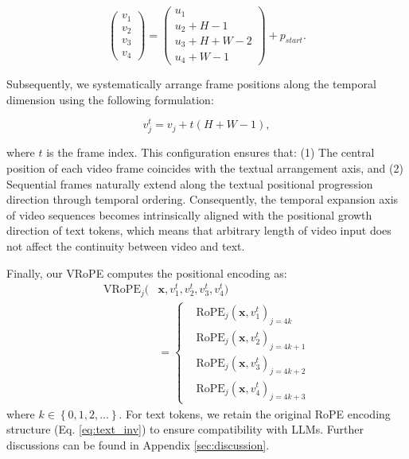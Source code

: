 \documentclass[11pt]{article}
\newcommand{\methodname}{VRoPE\xspace}
\begin{document}
\begin{equation}
\label{eq:center}
\begin{pmatrix}
v_{1} \\
v_{2} \\
v_{3} \\
v_{4}
\end{pmatrix} = 
\begin{pmatrix}
u_{1} \\
u_{2} + H - 1 \\
u_{3} + H + W -2 \\
u_{4} + W - 1
\end{pmatrix} + p_{start}.
\end{equation}

Subsequently, we systematically arrange frame positions along the temporal dimension using the following formulation:

\begin{equation}
\label{eq:offset}
v_{j}^{t} = v_{j} + t(H + W - 1),
\end{equation}

\noindent where $t$ is the frame index. This configuration ensures that: (1) The central position of each video frame coincides with the textual arrangement axis, and (2) Sequential frames naturally extend along the textual positional progression direction through temporal ordering. Consequently, the temporal expansion axis of video sequences becomes intrinsically aligned with the positional growth direction of text tokens, which means that arbitrary length of video input does not affect the continuity between video and text.

Finally, our \methodname computes the positional encoding as:
\begin{equation}
\begin{aligned}
\text{VRoPE}_{j}(& \mathbf{x}, v_{1}^{t}, v_{2}^{t}, v_{3}^{t}, v_{4}^{t}) \\
& = \left\{
\begin{aligned}
& \text{RoPE}_{j}(\mathbf{x}, v_{1}^{t})_{j = 4k} \\
& \text{RoPE}_{j}(\mathbf{x}, v_{2}^{t})_{j = 4k + 1} \\
& \text{RoPE}_{j}(\mathbf{x}, v_{3}^{t})_{j = 4k + 2} \\
& \text{RoPE}_{j}(\mathbf{x}, v_{4}^{t})_{j = 4k + 3}
\end{aligned}
\right.
\end{aligned}
\end{equation}
\noindent where $k \in \left\{0, 1, 2, ...\right\}$. For text tokens, we retain the original RoPE encoding structure (Eq. \ref{eq:text_inv}) to ensure compatibility with LLMs. Further discussions can be found in Appendix \ref{sec:discussion}.
\end{document}
